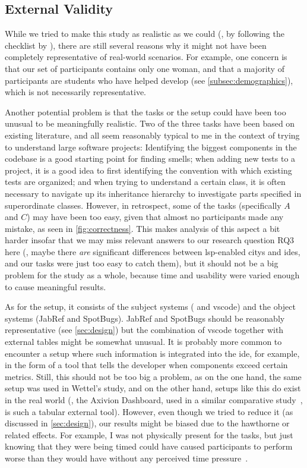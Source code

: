\documentclass[../thesis]{subfiles}
\begin{document}
\subsection{External Validity}
While we tried to make this study as realistic as we could (\eg, by following the checklist by \textcite{wettel2011}), there are still several reasons why it might not have been completely representative of real-world scenarios.
For example, one concern is that our set of participants contains only one woman, and that a majority of participants are students who have helped develop \SEE{} (see \cref{subsec:demographics}), which is not necessarily representative.

Another potential problem is that the tasks or the setup could have been too unusual to be meaningfully realistic.
Two of the three tasks have been based on existing literature, and all seem reasonably typical to me in the context of trying to understand large software projects:
Identifying the biggest components in the codebase is a good starting point for finding \glspl{smell};
when adding new tests to a project, it is a good idea to first identifying the convention with which existing tests are organized;
and when trying to understand a certain class, it is often necessary to navigate up its inheritance hierarchy to investigate parts specified in superordinate classes.
However, in retrospect, some of the tasks (specifically $A$ and $C$) may have been too easy, given that almost no participants made any mistake, as seen in \cref{fig:correctness}.
This makes analysis of this aspect a bit harder insofar that we may miss relevant answers to our research question \textsf{RQ3} here (\eg, maybe there \emph{are} significant differences between \gls{lsp}-enabled \glspl{city} and \glspl{ide}, and our tasks were just too easy to catch them), but it should not be a big problem for the study as a whole, because time and usability were varied enough to cause meaningful results.

As for the setup, it consists of the subject systems (\SEE{} and \gls{vscode}) and the object systems (JabRef and SpotBugs).
JabRef and SpotBugs should be reasonably representative (see \cref{sec:design}) but the combination of \gls{vscode} together with external tables might be somewhat unusual.
It is probably more common to encounter a setup where such information is integrated into the \gls{ide}, for example, in the form of a  tool that tells the developer when components exceed certain metrics.
Still, this should not be too big a problem, as on the one hand, the same setup was used in Wettel's study, and on the other hand, setups like this do exist in the real world (\eg, the Axivion Dashboard, used in a similar comparative study~\cite[section~4.1]{galperin2021}, is such a tabular external tool).
However, even though we tried to reduce it (as discussed in \cref{sec:design}), our results might be biased due to the \gls{hawthorne} or related effects.
For example, I was not physically present for the tasks, but just knowing that they were being timed could have caused participants to perform worse than they would have without any perceived time pressure~\cite[\eg,][]{sussman2022a}.
\end{document}
